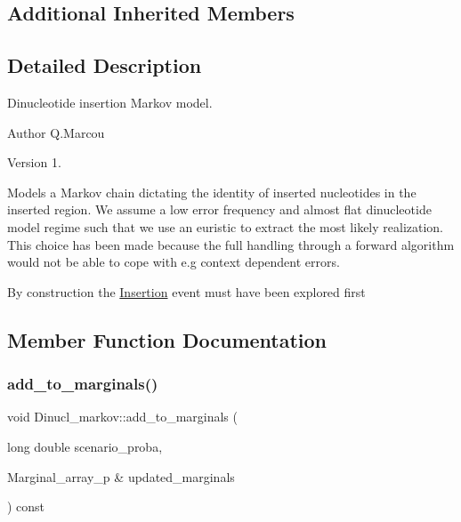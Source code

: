 \subsection*{Additional Inherited Members}


\subsection{Detailed Description}
Dinucleotide insertion Markov model. 

\begin{DoxyAuthor}{Author}
Q.\+Marcou 
\end{DoxyAuthor}
\begin{DoxyVersion}{Version}
1.
\end{DoxyVersion}
Models a Markov chain dictating the identity of inserted nucleotides in the inserted region. We assume a low error frequency and almost flat dinucleotide model regime such that we use an euristic to extract the most likely realization. This choice has been made because the full handling through a forward algorithm would not be able to cope with e.\+g context dependent errors.

By construction the \hyperlink{classInsertion}{Insertion} event must have been explored first 

\subsection{Member Function Documentation}
\mbox{\label{classDinucl__markov_a63fd37e31c3e32fee54dc26146bc3fac}} 
\subsubsection{\texorpdfstring{add\+\_\+to\+\_\+marginals()}{add\_to\_marginals()}}
{\footnotesize\ttfamily void Dinucl\+\_\+markov\+::add\+\_\+to\+\_\+marginals (\begin{DoxyParamCaption}\item[{long double}]{scenario\+\_\+proba,  }\item[{Marginal\+\_\+array\+\_\+p \&}]{updated\+\_\+marginals }\end{DoxyParamCaption}) const\hspace{0.3cm}{\ttfamily [virtual]}}

